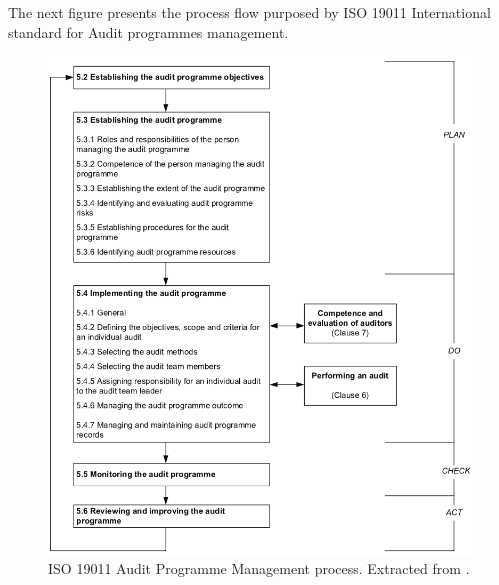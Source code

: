 The next figure presents the process flow purposed by ISO 19011 International standard for Audit programmes management.

\begin{figure}
\centering
\includegraphics[width=\textwidth]{img/ISO19011AuditProcess.png}
\caption{ISO 19011 Audit Programme Management process. Extracted from \cite{ISO19011}.}
\end{figure}




